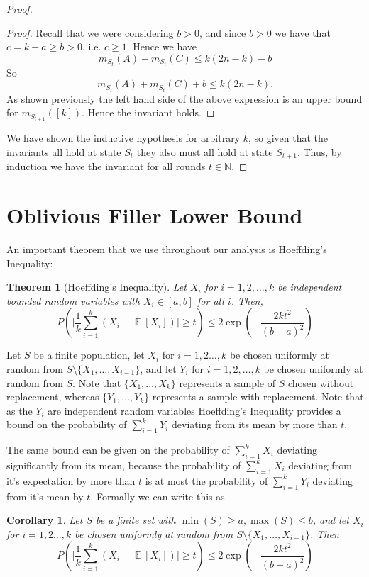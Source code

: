 \documentclass[twocolumn]{article}[10pt]
\DeclareMathOperator{\E}{\mathbb{E}}
\newtheorem{corollary}{Corollary}
\newtheorem{theorem}{Theorem}
\begin{document}
\begin{proof}
\begin{proof}
Recall that we were considering $b> 0$, and since $b>0$ we have that $c = k-a
\ge b > 0$, i.e. $c \ge 1$. 
Hence we have 
$$m_{S_t}(A) + m_{S_t}(C) \le k(2n-k) -b$$
So 
$$m_{S_t}(A) + m_{S_t}(C)+b \le k(2n-k).$$
As shown previously the left hand side of the above expression is an upper
bound for $m_{S_{t+1}}([k])$.
Hence the invariant holds.
  
\end{proof}

We have shown the inductive hypothesis for arbitrary $k$, so given that the
invariants all hold at state $S_t$ they also must all hold at state $S_{t+1}$.
Thus, by induction we have the invariant for all rounds $t\in\mathbb{N}$.
\end{proof}


\section{Oblivious Filler Lower Bound}\label{sec:oblivious}
An important theorem that we use throughout our analysis is Hoeffding's Inequality:
\begin{theorem}[Hoeffding's Inequality]
  Let $X_i$ for $i=1,2,\ldots, k$ be independent bounded random variables with
  $X_i \in [a,b]$ for all $i$. Then,
  $$P\left(\Big|\frac{1}{k} \sum_{i=1}^k (X_i - \E[X_i])\Big|\ge t\right) \le
  2\exp\left(-\frac{2kt^2}{(b-a)^2}\right) $$
\end{theorem}
Let $S$ be a finite population, let $X_i$ for $i=1,2\ldots, k$ be chosen
uniformly at random from $S \setminus \{X_1,\ldots, X_{i-1}\}$, and let $Y_i$
for $i=1,2,\ldots, k$ be chosen uniformly at random from $S$.
Note that $\{X_1,\ldots, X_k\}$ represents a sample of $S$ chosen without
replacement, whereas $\{Y_1,\ldots, Y_k\}$ represents a sample with
replacement. Note that as the $Y_i$ are independent random variables
Hoeffding's Inequality provides a bound on the probability of $\sum_{i=1}^k
Y_i$ deviating from its mean by more than $t$.

The same bound can be given on the probability of $\sum_{i=1}^k X_i$ deviating
significantly from its mean, because the probability of $\sum_{i=1}^k X_i$
deviating from it's expectation by more than $t$ is at most the probability of
$\sum_{i=1}^k Y_i$ deviating from it's mean by $t$.
Formally we can write this as 
\begin{corollary}
  \label{cor:hoeffdingwreplacement}
  Let $S$ be a finite set with $\min(S) \ge a, \max(S) \le b$, and let $X_i$
  for $i=1,2\ldots, k$ be chosen uniformly at random from $S \setminus
  \{X_1,\ldots, X_{i-1}\}$.
Then 
  $$P\left(\Big|\frac{1}{k} \sum_{i=1}^k (X_i - \E[X_i])\Big|\ge t\right) \le
  2\exp\left(-\frac{2kt^2}{(b-a)^2}\right) $$
\end{corollary}
\end{document}
